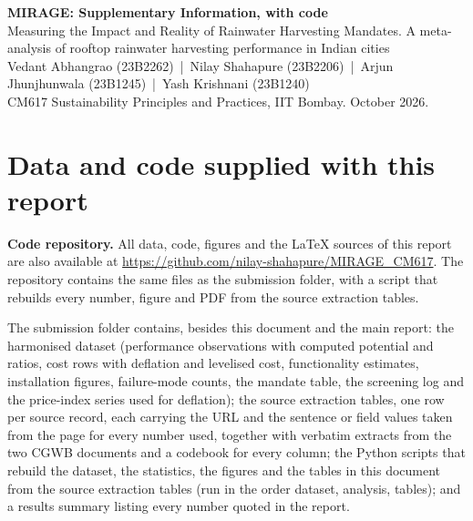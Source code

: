 
\usepackage{needspace}
\usepackage{listings}
\geometry{top=2cm,bottom=2cm,left=1.8cm,right=1.8cm}

\onecolumn
\begin{center}
{\LARGE\bfseries\color{mirageblue} MIRAGE: Supplementary Information, with code}\\[4pt]
{\large Measuring the Impact and Reality of Rainwater Harvesting Mandates. A meta-analysis of rooftop rainwater harvesting performance in Indian cities}\\[6pt]
Vedant Abhangrao (23B2262) \,|\, Nilay Shahapure (23B2206) \,|\, Arjun Jhunjhunwala (23B1245) \,|\, Yash Krishnani (23B1240)\\[2pt]
{\small CM617 Sustainability Principles and Practices, IIT Bombay. October 2026.}
\end{center}

\tableofcontents

\section{Data and code supplied with this report}
\textbf{Code repository.} All data, code, figures and the LaTeX sources of this report are also available at \url{https://github.com/nilay-shahapure/MIRAGE_CM617}. The repository contains the same files as the submission folder, with a script that rebuilds every number, figure and PDF from the source extraction tables.

The submission folder contains, besides this document and the main report: the harmonised dataset (performance observations with computed potential and ratios, cost rows with deflation and levelised cost, functionality estimates, installation figures, failure-mode counts, the mandate table, the screening log and the price-index series used for deflation); the source extraction tables, one row per source record, each carrying the URL and the sentence or field values taken from the page for every number used, together with verbatim extracts from the two CGWB documents and a codebook for every column; the Python scripts that rebuild the dataset, the statistics, the figures and the tables in this document from the source extraction tables (run in the order dataset, analysis, tables); and a results summary listing every number quoted in the report.

